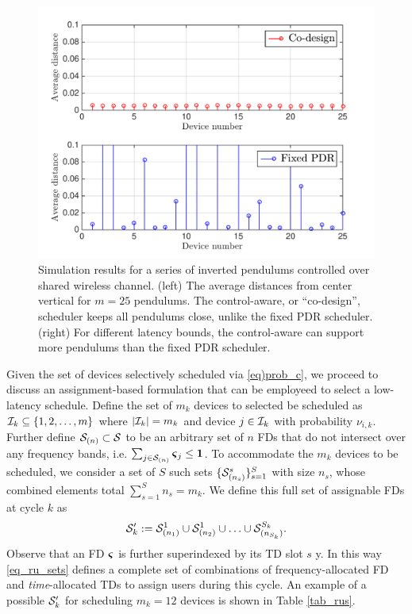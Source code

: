 \begin{figure}[t]
\centering
\includegraphics[width=0.4\linewidth,height=0.25\linewidth]{../images/ip_dist2.pdf} \qquad
 
\caption{Simulation results for a series of inverted pendulums controlled over shared wireless channel. (left) The average distances from center vertical for $m=25$ pendulums. The control-aware, or ``co-design'', scheduler keeps all pendulums close, unlike the fixed PDR scheduler. (right) For different latency bounds, the control-aware can support more pendulums than the fixed PDR scheduler.}\label{fig_sim_results}
\end{figure}


Given the set of devices selectively scheduled via \eqref{eq)prob_c}, we proceed to discuss an assignment-based formulation that can be employeed to select a low-latency schedule. Define the set of $m_k$ devices to selected be scheduled as ${\mathcal I}_k \subseteq \{1,2,\hdots,m\}$ where  $| {\mathcal I}_k| = m_k$ and device $j \in {\ensuremath{\mathcal I}}_k$ with probability $\nu_{i,k}$. Further define ${\mathcal S}_{(n)} \subset {\ensuremath{\mathcal S}}$ to be an arbitrary set of $n$ FDs that do not intersect over any frequency bands, i.e. $\sum_{j \in {\ensuremath{\mathcal S}}_{(n)}} \boldsymbol{\varsigma}_j \leq \mathbf{1}$. To accommodate the $m_k$ devices to be scheduled, we consider a set of $S$ such sets  $\{{\mathcal S}^s_{(n_s)}\}_{s=1}^S$ with size $n_s$, whose combined elements total $\sum_{s=1}^{S} n_s = m_k$. We define this full set of assignable FDs at cycle $k$ as
%
\begin{align}\label{eq_ru_sets}
{\ensuremath{\mathcal S}}'_k :={\mathcal S}^1_{(n_1)} \cup {\ensuremath{\mathcal S}}^1_{(n_2)} \cup \hdots \cup {\ensuremath{\mathcal S}}^{S_k}_{(n_{S_k})}.
\end{align}
%
Observe that an FD $\boldsymbol{\varsigma}$ is further superindexed by its TD slot $s$ y. In this way \eqref{eq_ru_sets} defines a complete set of  combinations of frequency-allocated FD and \emph{time}-allocated TDs to assign users during this cycle. An example of a possible ${\mathcal S}'_k$ for scheduling $m_k = 12$ devices is shown in Table \ref{tab_rus}. 



